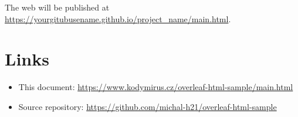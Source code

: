 \documentclass{article}
\begin{document}
The web will be published at \url{https://yourgitubusename.github.io/project_name/main.html}. 
\section{Links}
\begin{itemize}
    \item This document: \url{https://www.kodymirus.cz/overleaf-html-sample/main.html}
    \item Source repository: \url{https://github.com/michal-h21/overleaf-html-sample} 
\end{itemize}
 
\end{document}
